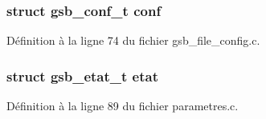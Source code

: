 \subsubsection[{conf}]{\setlength{\rightskip}{0pt plus 5cm}struct {\bf gsb\_\-conf\_\-t} {\bf conf}}\label{structures_8h_ac390e947e97cef2bec2f5d59d6ec1071}


Définition à la ligne 74 du fichier gsb\_\-file\_\-config.c.

\subsubsection[{etat}]{\setlength{\rightskip}{0pt plus 5cm}struct {\bf gsb\_\-etat\_\-t} {\bf etat}}\label{structures_8h_ab2a744f5d2124688473d13979420e911}


Définition à la ligne 89 du fichier parametres.c.

